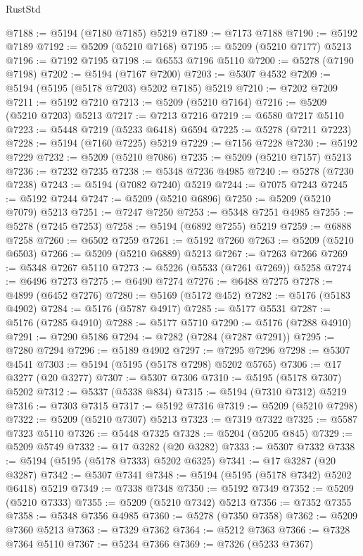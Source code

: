 \begin{lexlean}{RustStd}
\begin{coremodule}
@7188 := @5194 (@7180 @7185) @5219
@7189 := @7173 @7188
@7190 := @5192 @7189
@7192 := @5209 (@5210 @7168)
@7195 := @5209 (@5210 @7177) @5213
@7196 := @7192 @7195
@7198 := @6553 @7196 @5110
@7200 := @5278 (@7190 @7198)
@7202 := @5194 (@7167 @7200)
@7203 := @5307 @4532
@7209 := @5194 (@5195 (@5178 @7203) @5202 @7185) @5219
@7210 := @7202 @7209
@7211 := @5192 @7210
@7213 := @5209 (@5210 @7164)
@7216 := @5209 (@5210 @7203) @5213
@7217 := @7213 @7216
@7219 := @6580 @7217 @5110
@7223 := @5448 @7219 (@5233 @6418) @6594
@7225 := @5278 (@7211 @7223)
@7228 := @5194 (@7160 @7225) @5219
@7229 := @7156 @7228
@7230 := @5192 @7229
@7232 := @5209 (@5210 @7086)
@7235 := @5209 (@5210 @7157) @5213
@7236 := @7232 @7235
@7238 := @5348 @7236 @4985
@7240 := @5278 (@7230 @7238)
@7243 := @5194 (@7082 @7240) @5219
@7244 := @7075 @7243
@7245 := @5192 @7244
@7247 := @5209 (@5210 @6896)
@7250 := @5209 (@5210 @7079) @5213
@7251 := @7247 @7250
@7253 := @5348 @7251 @4985
@7255 := @5278 (@7245 @7253)
@7258 := @5194 (@6892 @7255) @5219
@7259 := @6888 @7258
@7260 := @6502 @7259
@7261 := @5192 @7260
@7263 := @5209 (@5210 @6503)
@7266 := @5209 (@5210 @6889) @5213
@7267 := @7263 @7266
@7269 := @5348 @7267 @5110
@7273 := @5226 (@5533 (@7261 @7269)) @5258
@7274 := @6496 @7273
@7275 := @6490 @7274
@7276 := @6488 @7275
@7278 := @4899 (@6452 @7276)
@7280 := @5169 (@5172 @452)
@7282 := @5176 (@5183 @4902)
@7284 := @5176 (@5787 @4917)
@7285 := @5177 @5531
@7287 := @5176 (@7285 @4910)
@7288 := @5177 @5710
@7290 := @5176 (@7288 @4910)
@7291 := @7290 @5186
@7294 := @7282 (@7284 (@7287 @7291))
@7295 := @7280 @7294
@7296 := @5189 @4902
@7297 := @7295 @7296
@7298 := @5307 @4541
@7303 := @5194 (@5195 (@5178 @7298) @5202 @5765)
@7306 := @17 @3277 (@20 @3277)
@7307 := @5307 @7306
@7310 := @5195 (@5178 @7307) @5202
@7312 := @5337 (@5338 @834)
@7315 := @5194 (@7310 @7312) @5219
@7316 := @7303 @7315
@7317 := @5192 @7316
@7319 := @5209 (@5210 @7298)
@7322 := @5209 (@5210 @7307) @5213
@7323 := @7319 @7322
@7325 := @5587 @7323 @5110
@7326 := @5448 @7325
@7328 := @5204 (@5205 @845)
@7329 := @5209 @5749
@7332 := @17 @3282 (@20 @3282)
@7333 := @5307 @7332
@7338 := @5194 (@5195 (@5178 @7333) @5202 @6325)
@7341 := @17 @3287 (@20 @3287)
@7342 := @5307 @7341
@7348 := @5194 (@5195 (@5178 @7342) @5202 @6418) @5219
@7349 := @7338 @7348
@7350 := @5192 @7349
@7352 := @5209 (@5210 @7333)
@7355 := @5209 (@5210 @7342) @5213
@7356 := @7352 @7355
@7358 := @5348 @7356 @4985
@7360 := @5278 (@7350 @7358)
@7362 := @5209 @7360 @5213
@7363 := @7329 @7362
@7364 := @5212 @7363
@7366 := @7328 @7364 @5110
@7367 := @5234 @7366
@7369 := @7326 (@5233 @7367)

\end{coremodule}
\end{lexlean}
